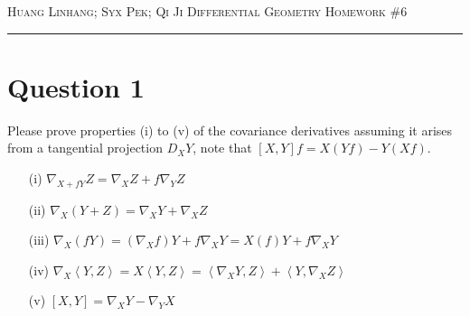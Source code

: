 \documentclass[12pt]{article}
\begin{document}
\thispagestyle{empty}

{\scshape Huang Linhang; Syx Pek; Qi Ji} \hfill {\scshape \large Differential Geometry} \hfill {\scshape Homework \#6}

\smallskip
\hrule
\bigskip

\section*{Question 1}
\newcommand*{\inner}[1]{\left\langle #1\right\rangle}
\newcommand*{\TWO}{\mathrm{II}}
\newcommand*{\pdd}[2]{\frac{\partial #1}{\partial #2}}
\newcommand*{\pd}[1]{\pdd{}{#1}}
Please prove properties (i) to (v) of the covariance derivatives
assuming it arises from a tangential projection \(D_XY\),
note that \([X,Y]f= X(Yf)-Y(Xf)\).
\begin{enumerate}
    \item[(i)] \(\nabla_{X + f Y} Z = \nabla_X Z + f \nabla_Y Z\)
    \item[(ii)] \(\nabla_X (Y + Z) = \nabla_X Y + \nabla_X Z\)
    \item[(iii)] \(\nabla_X (fY) = (\nabla_X f) Y + f\nabla_X Y = X (f) Y + f \nabla_X Y\)
    \item[(iv)] \(\nabla_X \inner{Y,Z} = X\inner{Y,Z} = \inner{\nabla_X Y,Z} + \inner{Y, \nabla_X Z}\)
    \item[(v)] \([X,Y] = \nabla_X Y - \nabla_Y X\)
\end{enumerate}
\end{document}
